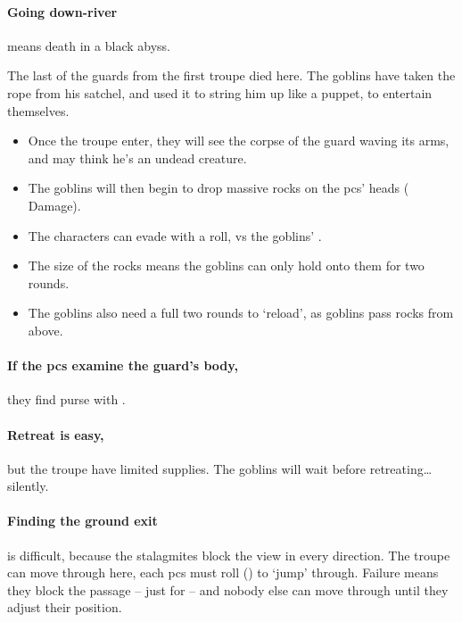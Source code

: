 \begin{multicols}{2}
\paragraph{Going down-river}
means death in a black abyss.



\begin{exampletext}
  The last of the \glspl{guard} from the first troupe died here.
  The goblins have taken the rope from his satchel, and used it to string him up like a puppet, to entertain themselves.
\end{exampletext}

\begin{itemize}
  \item
  Once the troupe enter, they will see the corpse of the \gls{guard} waving its arms, and may think he's an undead creature.
  \item
  The goblins will then begin to drop massive rocks on the \glspl{pc}' heads ( Damage).
  \item
  The characters can evade with a  roll, vs the goblins' .
  \item
  The size of the rocks means the goblins can only hold onto them for two \glspl{round}.
  \item
  The goblins also need a full two rounds to `reload', as goblins pass rocks from above.
\end{itemize}

\paragraph{If the \glspl{pc} examine the \gls{guard}'s body,}
they find  purse with \lootMedium.
\label{caveCoinsIII}
\setcounter{diceNo}{0}%
\renewcommand\npcsymbol{\currency}

\paragraph{Retreat is easy,}
but the troupe have limited supplies.
The goblins will wait  before retreating\ldots silently.

\paragraph{Finding the ground exit}
is difficult, because the stalagmites block the view in every direction.
The troupe can move through here, each \glspl{pc} must roll  (\tn[10]) to `jump' through.
Failure means they block the passage -- just for  -- and nobody else can move through until they adjust their position.


\end{multicols}
